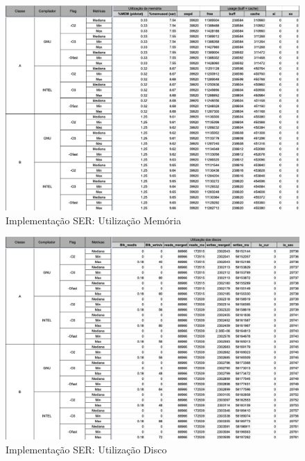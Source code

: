 \documentclass{article}
\begin{document}
\begin{appendices}
\begin{figure}[H]
    \centering
    \includegraphics[width=12cm]{Pictures/LUMZ_r431_SER_MEM.png}
    \caption{Implementação SER: Utilização Memória}
    \label{figure:LUMZ_r431_SER_MEM}
\end{figure}

\begin{figure}[H]
    \centering
    \includegraphics[width=12cm]{Pictures/LUMZ_r431_SER_DISK.png}
    \caption{Implementação SER: Utilização Disco}
    \label{figure:LUMZ_r431_SER_DISK}
\end{figure}


\end{appendices}
\end{document}
